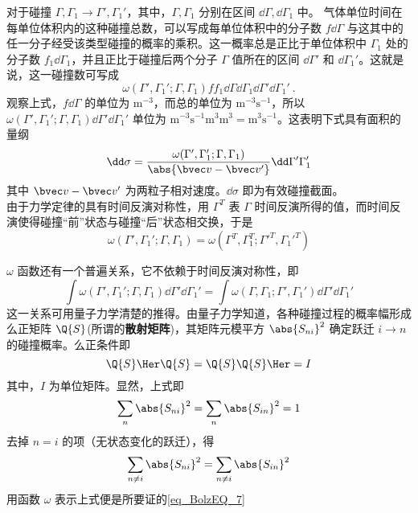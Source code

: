  对于碰撞 $\Gamma,\Gamma_1\rightarrow\Gamma',\Gamma_1'$，其中，$\Gamma,\Gamma_1$ 分别在区间 $\dd\Gamma,\dd\Gamma_1$ 中。 气体单位时间在每单位体积内的这种碰撞总数，可以写成每单位体积中的分子数 $f\dd\Gamma$ 与这其中的任一分子经受该类型碰撞的概率的乘积。这一概率总是正比于单位体积中 $\Gamma_1$ 处的分子数 $f_1\dd \Gamma_1$，并且正比于碰撞后两个分子 $\Gamma$ 值所在的区间 $\dd\Gamma'$ 和 $\dd \Gamma_1'$。这就是说，这一碰撞数可写成
 \begin{equation}\label{eq_BolzEQ_5}
\omega(\Gamma',\Gamma_1';\Gamma,\Gamma_1)ff_1\dd\Gamma\dd\Gamma_1\dd\Gamma'\dd\Gamma_1'~.
 \end{equation}
 观察上式，$f\dd \Gamma$ 的单位为 $\mathrm{m^{-3}}$，而总的单位为 $\mathrm{m^{-3}s^{-1}}$，所以 $\omega(\Gamma',\Gamma_1';\Gamma,\Gamma_1)\dd\Gamma'\dd\Gamma_1'$ 单位为 $\mathrm{m^{-3}s^{-1}m^{3}m^{3}=m^3s^{-1}}$。这表明下式具有面积的量纲
 \begin{equation}\label{eq_BolzEQ_2}
 \dd \sigma=\frac{\omega(\Gamma',\Gamma_1';\Gamma,\Gamma_1)}{\abs{\bvec v-\bvec v'}}\dd\Gamma'\Gamma_1'
 \end{equation}
 其中 $\bvec v-\bvec v'$ 为两粒子相对速度。$\dd\sigma$ 即为有效碰撞截面。\\

由于力学定律的具有时间反演对称性，用 $\Gamma^T$ 表 $\Gamma$ 时间反演所得的值，而时间反演使得碰撞“前”状态与碰撞“后”状态相交换，于是
 \begin{equation}
 \omega(\Gamma',\Gamma_1';\Gamma,\Gamma_1)=\omega(\Gamma^T,\Gamma_1^T;\Gamma'^T,\Gamma_1'^T)
 \end{equation}
 
$\omega$ 函数还有一个普遍关系，它不依赖于时间反演对称性，即
\begin{equation}\label{eq_BolzEQ_7}
\int\omega(\Gamma',\Gamma_1';\Gamma,\Gamma_1)\dd\Gamma'\dd\Gamma_1'=\int\omega(\Gamma,\Gamma_1;\Gamma',\Gamma_1')\dd\Gamma'\dd\Gamma_1'
\end{equation}
这一关系可用量子力学清楚的推得。由量子力学知道，各种碰撞过程的概率幅形成么正矩阵 $\Q{S}$(所谓的\textbf{散射矩阵})，其矩阵元模平方 $\abs{S_{ni}}^2$ 确定跃迁 $i\rightarrow n$ 的碰撞概率。么正条件即
\begin{equation}
\Q{S}\Her\Q{S}=\Q{S}\Q{S}\Her=I
\end{equation}
其中，$I$ 为单位矩阵。显然，上式即
\begin{equation}
\sum_n \abs{S_{ni}}^2=\sum_n \abs{S_{in}}^2=1
\end{equation}
去掉 $n=i$ 的项（无状态变化的跃迁），得
\begin{equation}
\sum_{n\neq i} \abs{S_{ni}}^2=\sum_{n\neq i} \abs{S_{in}}^2
\end{equation}
用函数 $\omega$ 表示上式便是所要证的\autoref{eq_BolzEQ_7} 
